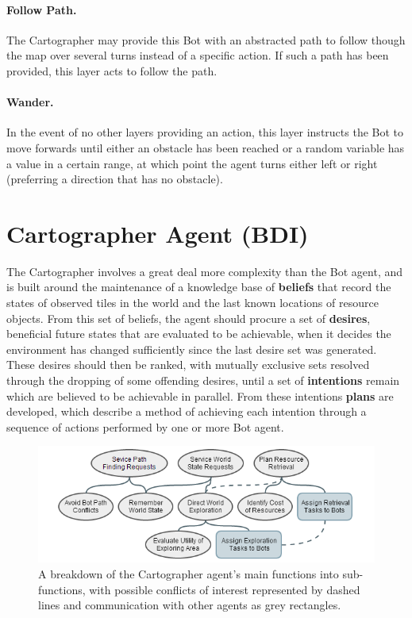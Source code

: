 \documentclass[a4paper,10pt]{article}
\begin{document}
\paragraph{Follow Path.} The Cartographer may provide this Bot with an abstracted path to follow though the map over several turns instead of a specific action. If such a path has been provided, this layer acts to follow the path.

\paragraph{Wander.} In the event of no other layers providing an action, this layer instructs the Bot to move forwards until either an obstacle has been reached or a random variable has a value in a certain range, at which point the agent turns either left or right (preferring a direction that has no obstacle).

\section{Cartographer Agent (BDI)}
The Cartographer involves a great deal more complexity than the Bot agent, and is built around the maintenance of a knowledge base of \textbf{beliefs} that record the states of observed tiles in the world and the last known locations of resource objects. From this set of beliefs, the agent should procure a set of \textbf{desires}, beneficial future states that are evaluated to be achievable, when it decides the environment has changed sufficiently since the last desire set was generated. These desires should then be ranked, with mutually exclusive sets resolved through the dropping of some offending desires, until a set of \textbf{intentions} remain which are believed to be achievable in parallel. From these intentions \textbf{plans} are developed, which describe a method of achieving each intention through a sequence of actions performed by one or more Bot agent.

\begin{figure}[ht]
  \centering
  \includegraphics[width=0.8\linewidth]{cartographer}
  \begin{minipage}[t]{0.8\textwidth}
    \caption{A breakdown of the Cartographer agent's main functions into sub-functions, with possible conflicts of interest represented by dashed lines and communication with other agents as grey rectangles.}
  \end{minipage}
\end{figure}
\end{document}
